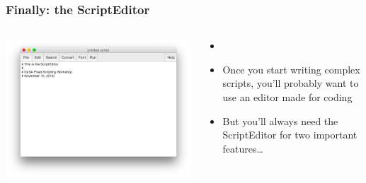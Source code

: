 \documentclass[handout]{beamer}
\begin{document}
\begin{frame}[fragile]
\frametitle{Finally: the ScriptEditor}
    
\begin{columns}[]
  \begin{column}{0.5\textwidth}
    \includegraphics[width=\textwidth]{graphics/scripteditor.png}
  \end{column}

  \begin{column}{0.5\textwidth}
    \begin{itemize}
        \item <1-> 
        \item <2-> Once you start writing complex scripts, you'll probably want to use an editor made for coding
        \item <3-> But you'll always need the ScriptEditor for two important features\ldots
    \end{itemize}
  \end{column}
\end{columns}

\end{frame}
\end{document}
